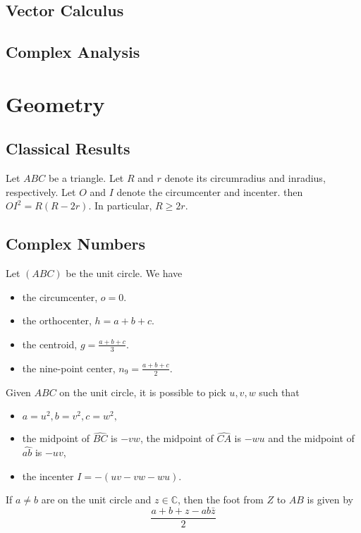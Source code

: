 \documentclass[11pt]{article}
\newcommand{\C}{\mathbb C}
\renewcommand{\hat}{\widehat}
\renewcommand{\>}{\rangle}
\newcommand{\<}{\langle}
\begin{document}
\subsection{Vector Calculus}
\subsection{Complex Analysis}
\pagebreak
\section{Geometry}
\subsection{Classical Results}
\begin{theorem}
\end{theorem}
\begin{theorem} Let $ABC$ be a triangle.  Let $R$ and $r$ denote its circumradius and inradius, respectively.  Let $O$ and $I$ denote the circumcenter and incenter.  then $OI^2 = R(R - 2r)$.  In particular, $R \ge 2r$.
\end{theorem}
\subsection{Complex Numbers}
\begin{theorem}
Let $(ABC)$ be the unit circle.  We have
\begin{itemize}
\item the circumcenter, $o = 0$.
\item the orthocenter, $h = a + b + c$.
\item the centroid, $g = \frac{a + b + c}{3}$.
\item the nine-point center, $n_9 = \frac{a + b + c }{ 2}$.
\end{itemize}
\end{theorem}
\begin{theorem} Given $ABC$ on the unit circle, it is possible to pick $u, v, w$ such that 
\begin{itemize}
\item $a = u^2, b = v^2, c = w^2,$
\item the midpoint of $\hat{BC}$ is $-vw$, the midpoint of $\hat{CA}$ is $-wu$ and the midpoint of $\hat{ab}$ is $-uv$,
\item the incenter $I = -(uv - vw - wu)$.
\end{itemize}
\end{theorem}
\begin{theorem} If $a \ne b$ are on the unit circle and $z \in \C$, then the foot from $Z$ to $AB$ is given by 
$$\frac{a + b + z - ab\bar{z}}{2 }$$
\end{theorem}
\end{document}

